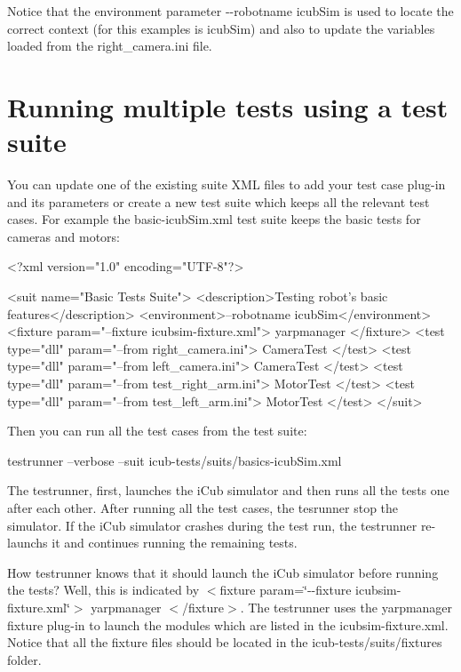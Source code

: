 Notice that the environment parameter {\ttfamily -\/-\/robotname icub\+Sim} is used to locate the correct context (for this examples is {\ttfamily icub\+Sim}) and also to update the variables loaded from the {\ttfamily right\+\_\+camera.\+ini} file.\hypertarget{writing-and-running_running_multiple_tests}{}\section{Running multiple tests using a test suite}\label{writing-and-running_running_multiple_tests}
You can update one of the existing suite X\+ML files to add your test case plug-\/in and its parameters or create a new test suite which keeps all the relevant test cases. For example the {\ttfamily basic-\/icub\+Sim.\+xml} test suite keeps the basic tests for cameras and motors\+:


\begin{DoxyCode}
<?xml version=\textcolor{stringliteral}{"1.0"} encoding=\textcolor{stringliteral}{"UTF-8"}?>

<suit name=\textcolor{stringliteral}{"Basic Tests Suite"}>
    <description>Testing robot\textcolor{stringliteral}{'s basic features</description>}
\textcolor{stringliteral}{    <environment>--robotname icubSim</environment>}
\textcolor{stringliteral}{    <fixture param="--fixture icubsim-fixture.xml"> yarpmanager </fixture>}
\textcolor{stringliteral}{}
\textcolor{stringliteral}{    }
\textcolor{stringliteral}{    <test type="dll" param="--from right\_camera.ini"> CameraTest </test>}
\textcolor{stringliteral}{    <test type="dll" param="--from left\_camera.ini"> CameraTest </test> }
\textcolor{stringliteral}{}
\textcolor{stringliteral}{    }
\textcolor{stringliteral}{    <test type="dll" param="--from test\_right\_arm.ini"> MotorTest </test>}
\textcolor{stringliteral}{    <test type="dll" param="--from test\_left\_arm.ini"> MotorTest </test>}
\textcolor{stringliteral}{</suit>}
\end{DoxyCode}


Then you can run all the test cases from the test suite\+:


\begin{DoxyCode}
testrunner --verbose --suit icub-tests/suits/basics-icubSim.xml
\end{DoxyCode}


The {\ttfamily testrunner}, first, launches the i\+Cub simulator and then runs all the tests one after each other. After running all the test cases, the {\ttfamily tesrunner} stop the simulator. If the i\+Cub simulator crashes during the test run, the {\ttfamily testrunner} re-\/launchs it and continues running the remaining tests.

How {\ttfamily testrunner} knows that it should launch the i\+Cub simulator before running the tests? Well, this is indicated by {\ttfamily $<$fixture param=\char`\"{}-\/-\/fixture icubsim-\/fixture.\+xml\char`\"{}$>$ yarpmanager $<$/fixture$>$}. The {\ttfamily testrunner} uses the {\ttfamily yarpmanager} fixture plug-\/in to launch the modules which are listed in the {\ttfamily icubsim-\/fixture.\+xml}. Notice that all the fixture files should be located in the {\ttfamily icub-\/tests/suits/fixtures} folder. 